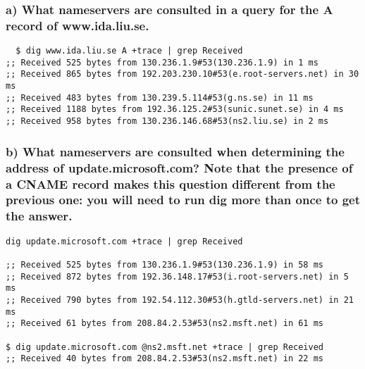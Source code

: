 \subsubsection{a) What nameservers are consulted in a query for the A record of www.ida.liu.se.}
\begin{verbatim}
  $ dig www.ida.liu.se A +trace | grep Received
;; Received 525 bytes from 130.236.1.9#53(130.236.1.9) in 1 ms
;; Received 865 bytes from 192.203.230.10#53(e.root-servers.net) in 30 ms
;; Received 483 bytes from 130.239.5.114#53(g.ns.se) in 11 ms
;; Received 1188 bytes from 192.36.125.2#53(sunic.sunet.se) in 4 ms
;; Received 958 bytes from 130.236.146.68#53(ns2.liu.se) in 2 ms
\end{verbatim}

\subsubsection{b) What nameservers are consulted when determining the address of update.microsoft.com? Note that the presence of a CNAME record makes this question different from the previous one: you will need to run dig more than once to get the answer.}
\begin{verbatim}
dig update.microsoft.com +trace | grep Received

;; Received 525 bytes from 130.236.1.9#53(130.236.1.9) in 58 ms
;; Received 872 bytes from 192.36.148.17#53(i.root-servers.net) in 5 ms
;; Received 790 bytes from 192.54.112.30#53(h.gtld-servers.net) in 21 ms
;; Received 61 bytes from 208.84.2.53#53(ns2.msft.net) in 61 ms

$ dig update.microsoft.com @ns2.msft.net +trace | grep Received
;; Received 40 bytes from 208.84.2.53#53(ns2.msft.net) in 22 ms
\end{verbatim}



